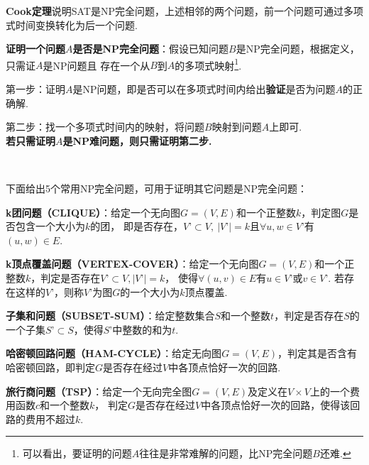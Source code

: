 \documentclass[12pt, a4paper, oneside]{ctexart}
\numberwithin{equation}{section}  %
\theoremstyle{definition}
\begin{document}
\textbf{Cook定理}说明SAT是NP完全问题，上述相邻的两个问题，前一个问题可通过多项式时间变换转化为后一个问题.

\textbf{证明一个问题$A$是否是NP完全问题}：假设已知问题$B$是NP完全问题，根据定义，只需证$A$是NP问题且
存在一个从$B$到$A$的多项式映射\footnote[1]{可以看出，要证明的问题$A$往往是非常难解的问题，比NP完全问题$B$还难.}. 

第一步：证明$A$是NP问题，即是否可以在多项式时间内给出\textbf{验证}是否为问题$A$的正确解.

第二步：找一个多项式时间内的映射，将问题$B$映射到问题$A$上即可.\\
\textbf{若只需证明$A$是NP难问题，则只需证明第二步.}

\ 

下面给出5个常用NP完全问题，可用于证明其它问题是NP完全问题：

\textbf{k团问题（CLIQUE）}：给定一个无向图$G=(V,E)$和一个正整数$k$，判定图$G$是否包含一个大小为$k$的团，
即是否存在，$V’\subset V,\ |V’|=k$且$\forall u, w\in V’$有$(u,w)\in E$.

\textbf{k顶点覆盖问题（VERTEX-COVER）}：给定一个无向图$G=(V,E)$和一个正整数$k$，判定是否存在$V’\subset V, |V’|=k$，
使得$\forall (u,v)\in E$有$u\in V’$或$v\in V’$. 若存在这样的$V’$，则称$V’$为图$G$的一个大小为$k$顶点覆盖.

\textbf{子集和问题（SUBSET-SUM）}：给定整数集合$S$和一个整数$t$，判定是否存在$S$的一个子集$S’\subset S$，使得$S’$中整数的和为$t$.

\textbf{哈密顿回路问题（HAM-CYCLE）}：给定无向图$G=(V,E)$，判定其是否含有哈密顿回路，即判定$G$是否存在经过$V$中各顶点恰好一次的回路.

\textbf{旅行商问题（TSP）}：给定一个无向完全图$G=(V,E)$及定义在$V\times V$上的一个费用函数$c$和一个整数$k$，
判定$G$是否存在经过$V$中各顶点恰好一次的回路，使得该回路的费用不超过$k$.
\end{document}
